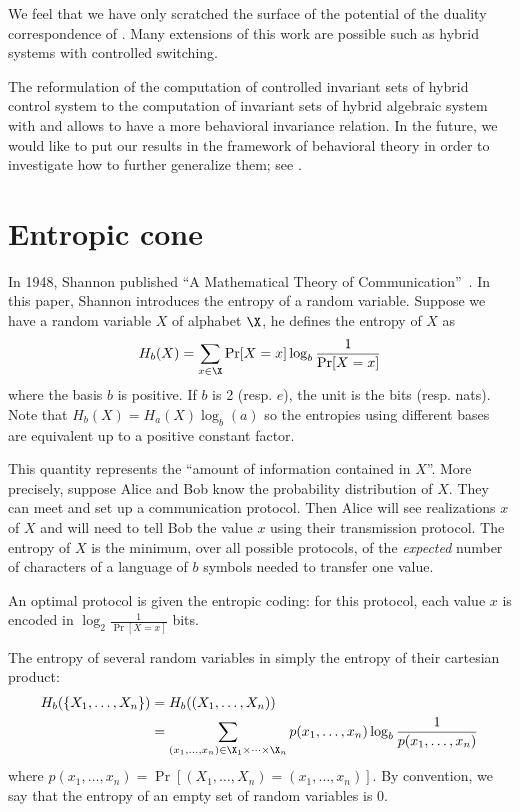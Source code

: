 \documentclass[11pt,twoside,a4paper,openright]{uclouvain-thesis}
\begin{document}
We feel that we have only scratched the surface of the potential of the duality correspondence of .
Many extensions of this work are possible
such as hybrid systems with controlled switching.

The reformulation of the computation of controlled invariant sets of hybrid control system to the computation of invariant sets of hybrid algebraic system with  and  allows to have a more behavioral invariance relation.
In the future, we would like to put our results in the framework of behavioral theory in order to investigate how to further generalize them; see \cite{willems2013introduction}.

\chapter{Entropic cone}
\label{chap:entropic}

In 1948, Shannon published ``A Mathematical Theory of Communication''~\cite{shannon1948mathematical}.
In this paper, Shannon introduces the entropy of a random variable.
Suppose we have a random variable $X$ of alphabet $\X$, he defines the entropy of $X$ as
\[ H_b(X) = \sum_{x \in \X} \Pr[X = x] \log_b \frac{1}{\Pr[X = x]} \]
where the basis $b$ is positive.
If $b$ is 2 (resp. $e$), the unit is the bits (resp. nats).
Note that $H_b(X) = H_a(X) \log_b(a)$ so the entropies using different bases are equivalent up to a positive constant factor.

This quantity represents the ``amount of information contained in $X$''.
More precisely, suppose Alice and Bob know the probability distribution of $X$.
They can meet and set up a communication protocol.
Then Alice will see realizations $x$ of $X$ and will need to tell Bob the value $x$ using their transmission protocol.
The entropy of $X$ is the minimum, over all possible protocols, of the \emph{expected} number of characters of a language of $b$ symbols needed to transfer one value.

An optimal protocol is given the entropic coding: for this protocol,
each value $x$ is encoded in $\log_2\frac{1}{\Pr[X = x]}$ bits.

The entropy of several random variables in simply the entropy of their cartesian product:
\begin{align*}
  H_b(\{X_1, \ldots, X_n\})
  & = H_b((X_1, \ldots, X_n))\\
  & = \sum_{(x_1,\ldots,x_n) \in \X_1 \times \cdots \times \X_n} p(x_1, \ldots, x_n) \log_b \frac{1}{p(x_1, \ldots, x_n)}
\end{align*}
where $p(x_1, \ldots, x_n) = \Pr[(X_1, \ldots, X_n) = (x_1,\ldots,x_n)]$.
By convention, we say that the entropy of an empty set of random variables is 0.
\end{document}

